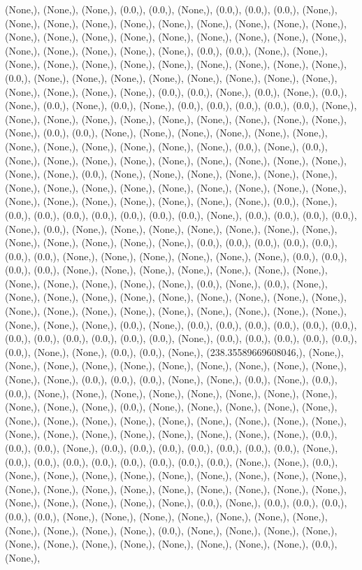 \documentclass{article}
\begin{document}
(None,), (None,), (None,), (0.0,), (0.0,), (None,), (0.0,), (0.0,), (0.0,), (None,), (None,), (None,), (None,), (None,), (None,), (None,), (None,), (None,), (None,), (None,), (None,), (None,), (None,), (None,), (None,), (None,), (None,), (None,), (None,), (None,), (None,), (None,), (None,), (0.0,), (0.0,), (None,), (None,), (None,), (None,), (None,), (None,), (None,), (None,), (None,), (None,), (None,), (0.0,), (None,), (None,), (None,), (None,), (None,), (None,), (None,), (None,), (None,), (None,), (None,), (None,), (0.0,), (0.0,), (None,), (0.0,), (None,), (0.0,), (None,), (0.0,), (None,), (0.0,), (None,), (0.0,), (0.0,), (0.0,), (0.0,), (0.0,), (None,), (None,), (None,), (None,), (None,), (None,), (None,), (None,), (None,), (None,), (None,), (0.0,), (0.0,), (None,), (None,), (None,), (None,), (None,), (None,), (None,), (None,), (None,), (None,), (None,), (None,), (0.0,), (None,), (0.0,), (None,), (None,), (None,), (None,), (None,), (None,), (None,), (None,), (None,), (None,), (None,), (0.0,), (None,), (None,), (None,), (None,), (None,), (None,), (None,), (None,), (None,), (None,), (None,), (None,), (None,), (None,), (None,), (None,), (None,), (None,), (None,), (None,), (None,), (None,), (0.0,), (None,), (0.0,), (0.0,), (0.0,), (0.0,), (0.0,), (0.0,), (0.0,), (None,), (0.0,), (0.0,), (0.0,), (0.0,), (None,), (0.0,), (None,), (None,), (None,), (None,), (None,), (None,), (None,), (None,), (None,), (None,), (None,), (None,), (0.0,), (0.0,), (0.0,), (0.0,), (0.0,), (0.0,), (0.0,), (None,), (None,), (None,), (None,), (None,), (None,), (0.0,), (0.0,), (0.0,), (0.0,), (None,), (None,), (None,), (None,), (None,), (None,), (None,), (None,), (None,), (None,), (None,), (None,), (0.0,), (None,), (0.0,), (None,), (None,), (None,), (None,), (None,), (None,), (None,), (None,), (None,), (None,), (None,), (None,), (None,), (None,), (None,), (None,), (None,), (None,), (None,), (None,), (None,), (None,), (0.0,), (None,), (0.0,), (0.0,), (0.0,), (0.0,), (0.0,), (0.0,), (0.0,), (0.0,), (0.0,), (0.0,), (0.0,), (0.0,), (None,), (0.0,), (0.0,), (0.0,), (0.0,), (0.0,), (0.0,), (None,), (None,), (0.0,), (0.0,), (None,), (238.35589669608046,), (None,), (None,), (None,), (None,), (None,), (None,), (None,), (None,), (None,), (None,), (None,), (None,), (0.0,), (0.0,), (0.0,), (None,), (None,), (0.0,), (None,), (0.0,), (0.0,), (None,), (None,), (None,), (None,), (None,), (None,), (None,), (None,), (None,), (None,), (None,), (0.0,), (None,), (None,), (None,), (None,), (None,), (None,), (None,), (None,), (None,), (None,), (None,), (None,), (None,), (None,), (None,), (None,), (None,), (None,), (None,), (None,), (None,), (None,), (0.0,), (0.0,), (0.0,), (None,), (0.0,), (0.0,), (0.0,), (0.0,), (0.0,), (0.0,), (0.0,), (None,), (0.0,), (0.0,), (0.0,), (0.0,), (0.0,), (0.0,), (0.0,), (0.0,), (None,), (None,), (0.0,), (None,), (None,), (None,), (None,), (None,), (None,), (None,), (None,), (None,), (None,), (None,), (None,), (None,), (None,), (None,), (None,), (None,), (None,), (None,), (None,), (None,), (None,), (None,), (0.0,), (None,), (0.0,), (0.0,), (0.0,), (0.0,), (0.0,), (None,), (None,), (None,), (None,), (None,), (None,), (None,), (None,), (None,), (None,), (None,), (0.0,), (None,), (None,), (None,), (None,), (None,), (None,), (None,), (None,), (None,), (None,), (None,), (None,), (0.0,), (None,), 
\end{document}
